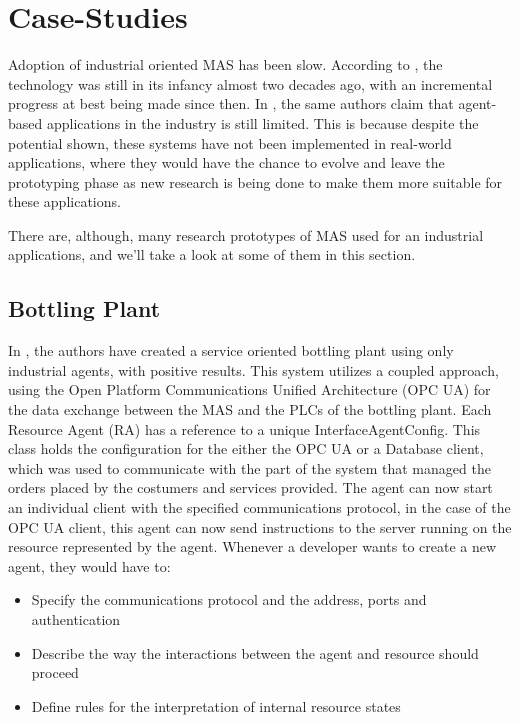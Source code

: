 
\section{Case-Studies}

Adoption of industrial oriented MAS has been slow. According to \cite{karnouskos02}, the technology was still in its infancy almost two decades ago, with an incremental progress at best being made since then. In \cite{Karnouskos2019}, the same authors claim that agent-based applications in the industry is still limited. This is because despite the potential shown, these systems have not been implemented in real-world applications, where they would have the chance to evolve and leave the prototyping phase as new research is being done to make them more suitable for these applications.

There are, although, many research prototypes of MAS used for an industrial applications, and we'll take a look at some of them in this section.

\subsection{Bottling Plant}

In \cite{marschall01}, the authors have created a service oriented bottling plant using only industrial agents, with positive results. This system utilizes a coupled approach, using the Open Platform Communications Unified Architecture (OPC UA) for the data exchange between the MAS and the PLCs of the bottling plant. Each Resource Agent (RA) has a reference to a unique InterfaceAgentConfig. This class holds the configuration for the either the OPC UA or a Database client, which was used to communicate with the part of the system that managed the orders placed by the costumers and services provided. The agent can now start an individual client with the specified communications protocol, in the case of the OPC UA client, this agent can now send instructions to the server running on the resource represented by the agent.
Whenever a developer wants to create a new agent, they would have to:
\begin{itemize}
	\item Specify the communications protocol and the address, ports and authentication
	\item Describe the way the interactions between the agent and resource should proceed
	\item Define rules for the interpretation of internal resource states
\end{itemize}

